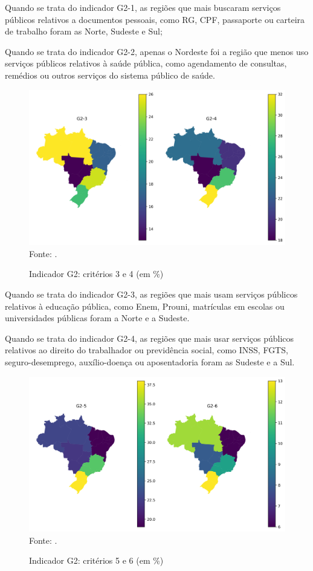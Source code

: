 Quando se trata do indicador G2-1, as regiões que mais buscaram serviços públicos relativos a documentos pessoais, como RG, CPF, passaporte ou carteira de trabalho foram as Norte, Sudeste e Sul;

Quando se trata do indicador G2-2, apenas o Nordeste foi a região que menos uso serviços públicos relativos à saúde pública, como agendamento de consultas, remédios ou outros serviços do sistema público de saúde.

\begin{figure}[H]
	\centering
	\caption{Indicador G2: critérios 3 e 4 (em \%)}
	\includegraphics[width=1\linewidth]{figuras/mapa_coropletico_tic_domicilios_2024_g2_3_4.png}
	\label{fig:mapa_coropletico_tic_domicilios_2024_g2_3_4}
	\footnotesize{Fonte: \cite{tic_domicilios_2024_g2}.}
\end{figure}

Quando se trata do indicador G2-3, as regiões que mais usam serviços públicos relativos à educação pública, como Enem, Prouni, matrículas em escolas ou universidades públicas foram a Norte e a Sudeste.

Quando se trata do indicador G2-4, as regiões que mais usar serviços públicos relativos ao direito do trabalhador ou previdência social, como INSS, FGTS, seguro-desemprego, auxílio-doença ou aposentadoria foram as Sudeste e a Sul.

\begin{figure}[H]
	\centering
	\caption{Indicador G2: critérios 5 e 6 (em \%)}
	\includegraphics[width=1\linewidth]{figuras/mapa_coropletico_tic_domicilios_2024_g2_5_6.png}
	\label{fig:mapa_coropletico_tic_domicilios_2024_g2_5_6}
	\footnotesize{Fonte: \cite{tic_domicilios_2024_g2}.}
\end{figure}

